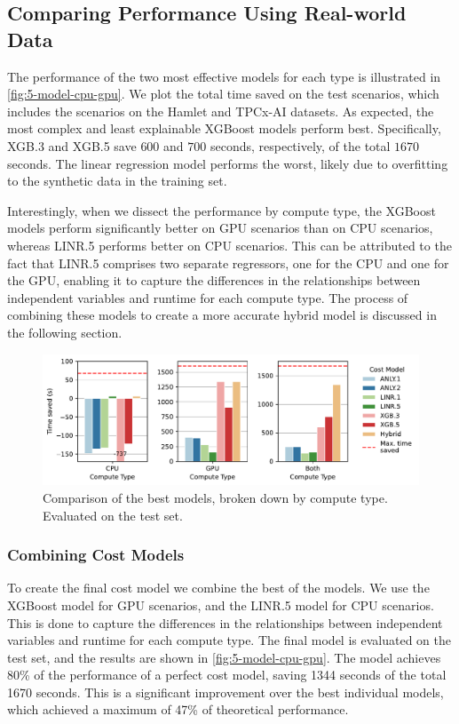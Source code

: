 \subsection{Comparing Performance Using Real-world Data}
\label{subsec:5-comparing-performance}
The performance of the two most effective models for each type is illustrated in \autoref{fig:5-model-cpu-gpu}. We plot the total time saved on the test scenarios, which includes the scenarios on the Hamlet and TPCx-AI datasets. As expected, the most complex and least explainable XGBoost models perform best. Specifically, XGB.3 and XGB.5 save $600$ and $700$ seconds, respectively, of the total $1670$ seconds. The linear regression model performs the worst, likely due to overfitting to the synthetic data in the training set.

Interestingly, when we dissect the performance by compute type, the XGBoost models perform significantly better on GPU scenarios than on CPU scenarios, whereas LINR.5 performs better on CPU scenarios. This can be attributed to the fact that LINR.5 comprises two separate regressors, one for the CPU and one for the GPU, enabling it to capture the differences in the relationships between independent variables and runtime for each compute type. The process of combining these models to create a more accurate hybrid model is discussed in the following section.

\begin{figure}[ht]
    \centering
    \includegraphics[width=0.9\linewidth]{chapters/05_cost_estimation/figures/compare_gpu_vs_cpu.pdf}
    \caption[Cost Model Comparison Broken Down by Compute Type]{Comparison of the best models, broken down by compute type. Evaluated on the test set.}
    \label{fig:5-model-cpu-gpu}
\end{figure}

\subsubsection{Combining Cost Models}
\label{subsec:5-hybrid}
To create the final cost model we combine the best of the models. We use the XGBoost model for GPU scenarios, and the LINR.5 model for CPU scenarios. This is done to capture the differences in the relationships between independent variables and runtime for each compute type. The final model is evaluated on the test set, and the results are shown in \autoref{fig:5-model-cpu-gpu}. The model achieves 80\% of the performance of a perfect cost model, saving 1344 seconds of the total 1670 seconds. This is a significant improvement over the best individual models, which achieved a maximum of 47\% of theoretical performance.

